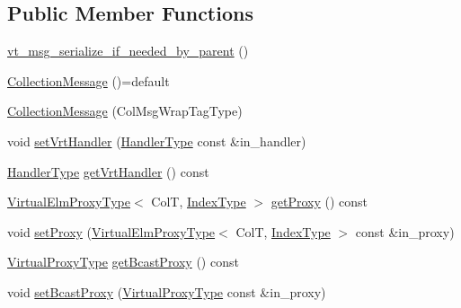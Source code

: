 \subsection*{Public Member Functions}
\begin{DoxyCompactItemize}
\item 
\hyperlink{structvt_1_1vrt_1_1collection_1_1_collection_message_a0fc711471f331ab5db164449977abd40}{vt\+\_\+msg\+\_\+serialize\+\_\+if\+\_\+needed\+\_\+by\+\_\+parent} ()
\item 
\hyperlink{structvt_1_1vrt_1_1collection_1_1_collection_message_a67157cfe91f1138728cf8c4ea14a0778}{Collection\+Message} ()=default
\item 
\hyperlink{structvt_1_1vrt_1_1collection_1_1_collection_message_a8012bc5471893e2daedeab8aa4ed1509}{Collection\+Message} (Col\+Msg\+Wrap\+Tag\+Type)
\item 
void \hyperlink{structvt_1_1vrt_1_1collection_1_1_collection_message_aa6986dc4ba8ac540311a882bef86e80c}{set\+Vrt\+Handler} (\hyperlink{namespacevt_af64846b57dfcaf104da3ef6967917573}{Handler\+Type} const \&in\+\_\+handler)
\item 
\hyperlink{namespacevt_af64846b57dfcaf104da3ef6967917573}{Handler\+Type} \hyperlink{structvt_1_1vrt_1_1collection_1_1_collection_message_aa5966355f4fe5f9ac7dc965a7f6e4de4}{get\+Vrt\+Handler} () const
\item 
\hyperlink{namespacevt_1_1vrt_a620a5c8c59d13e513f690c74b4af516f}{Virtual\+Elm\+Proxy\+Type}$<$ ColT, \hyperlink{structvt_1_1vrt_1_1collection_1_1_collection_message_a324978c38e67d1bfa86c8db172e77594}{Index\+Type} $>$ \hyperlink{structvt_1_1vrt_1_1collection_1_1_collection_message_a195386067f31cffdecbce5f05bfba5f2}{get\+Proxy} () const
\item 
void \hyperlink{structvt_1_1vrt_1_1collection_1_1_collection_message_a38349a148d8dbcab2a4a54efa2089e1c}{set\+Proxy} (\hyperlink{namespacevt_1_1vrt_a620a5c8c59d13e513f690c74b4af516f}{Virtual\+Elm\+Proxy\+Type}$<$ ColT, \hyperlink{structvt_1_1vrt_1_1collection_1_1_collection_message_a324978c38e67d1bfa86c8db172e77594}{Index\+Type} $>$ const \&in\+\_\+proxy)
\item 
\hyperlink{namespacevt_a1b417dd5d684f045bb58a0ede70045ac}{Virtual\+Proxy\+Type} \hyperlink{structvt_1_1vrt_1_1collection_1_1_collection_message_a25c1d0924ade6a7e074fc419a75c8a71}{get\+Bcast\+Proxy} () const
\item 
void \hyperlink{structvt_1_1vrt_1_1collection_1_1_collection_message_a0f4be7193beb77e9862417a5eb6cff5a}{set\+Bcast\+Proxy} (\hyperlink{namespacevt_a1b417dd5d684f045bb58a0ede70045ac}{Virtual\+Proxy\+Type} const \&in\+\_\+proxy)

\end{DoxyCompactItemize}
